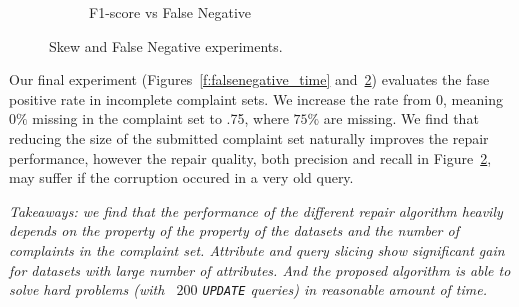 \begin{figure}[h]
\begin{subfigure}[t]{.3\textwidth}
    \vspace*{-.2in}
    \caption{F1-score vs False Negative}
    \label{f:falsenegative_acc} 
    \end{subfigure}
    \vspace*{-.1in}
    \caption{Skew and False Negative experiments. }
  \end{figure}





Our final experiment (Figures~\ref{f:falsenegative_time} and~\ref{f:falsenegative_acc}) evaluates the fase positive rate in incomplete complaint sets.
We increase the rate from $0$, meaning $0\%$ missing in the complaint set to .75, where $75\%$ are missing.  
We find that reducing the size of the submitted complaint set naturally improves the repair performance,
however the repair quality, both precision and recall in Figure~\ref{f:falsenegative_acc}, may suffer if the corruption occured in a very old query.


% 

{\it Takeaways: we find that the performance of the different repair algorithm 
heavily depends on the property of the property of the datasets and the 
number of complaints in the complaint set. Attribute and query slicing show significant gain for 
datasets with large number of attributes. And the proposed \sys algorithm is able to solve hard problems
(with ~$200$ \texttt{UPDATE} queries) in reasonable amount of time. }















